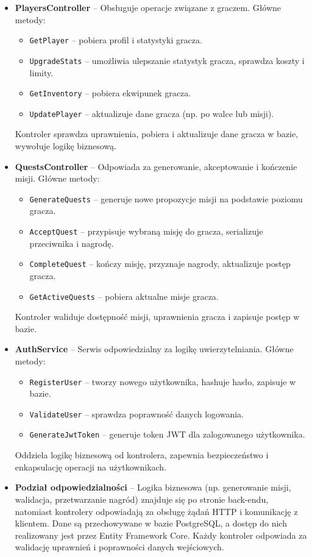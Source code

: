 \begin{itemize}
    \item \textbf{PlayersController} -- Obsługuje operacje związane z graczem. Główne metody:
    \begin{itemize}
        \item \texttt{GetPlayer} -- pobiera profil i statystyki gracza.
        \item \texttt{UpgradeStats} -- umożliwia ulepszanie statystyk gracza, sprawdza koszty i limity.
        \item \texttt{GetInventory} -- pobiera ekwipunek gracza.
        \item \texttt{UpdatePlayer} -- aktualizuje dane gracza (np. po walce lub misji).
    \end{itemize}
    Kontroler sprawdza uprawnienia, pobiera i aktualizuje dane gracza w bazie, wywołuje logikę biznesową.

    \item \textbf{QuestsController} -- Odpowiada za generowanie, akceptowanie i kończenie misji. Główne metody:
    \begin{itemize}
        \item \texttt{GenerateQuests} -- generuje nowe propozycje misji na podstawie poziomu gracza.
        \item \texttt{AcceptQuest} -- przypisuje wybraną misję do gracza, serializuje przeciwnika i nagrodę.
        \item \texttt{CompleteQuest} -- kończy misję, przyznaje nagrody, aktualizuje postęp gracza.
        \item \texttt{GetActiveQuests} -- pobiera aktualne misje gracza.
    \end{itemize}
    Kontroler waliduje dostępność misji, uprawnienia gracza i zapisuje postęp w bazie.

    \item \textbf{AuthService} -- Serwis odpowiedzialny za logikę uwierzytelniania. Główne metody:
    \begin{itemize}
        \item \texttt{RegisterUser} -- tworzy nowego użytkownika, hashuje hasło, zapisuje w bazie.
        \item \texttt{ValidateUser} -- sprawdza poprawność danych logowania.
        \item \texttt{GenerateJwtToken} -- generuje token JWT dla zalogowanego użytkownika.
    \end{itemize}
    Oddziela logikę biznesową od kontrolera, zapewnia bezpieczeństwo i enkapsulację operacji na użytkownikach.

    \item \textbf{Podział odpowiedzialności} -- Logika biznesowa (np. generowanie misji, walidacja, przetwarzanie nagród) znajduje się po stronie back-endu, natomiast kontrolery odpowiadają za obsługę żądań HTTP i komunikację z klientem. Dane są przechowywane w bazie PostgreSQL, a dostęp do nich realizowany jest przez Entity Framework Core. Każdy kontroler odpowiada za walidację uprawnień i poprawności danych wejściowych.
\end{itemize}


